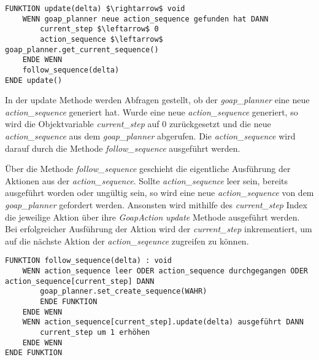 %

\begin{lstlisting}[language=Pseudo, caption={update Methode des \textit{GoapAgent}}, mathescape=true]
FUNKTION update(delta) $\rightarrow$ void
    WENN goap_planner neue action_sequence gefunden hat DANN
        current_step $\leftarrow$ 0
        action_sequence $\leftarrow$ goap_planner.get_current_sequence()
    ENDE WENN
    follow_sequence(delta)
ENDE update()
\end{lstlisting}

In der update Methode werden Abfragen gestellt, ob der \textit{goap\_planner} eine neue \textit{action\_sequence} generiert hat. Wurde eine neue \textit{action\_sequence} generiert, so wird die Objektvariable \textit{current\_step} auf $0$ zurückgesetzt und die neue \textit{action\_sequence} aus dem \textit{goap\_planner} abgerufen. Die \textit{action\_sequence} wird darauf durch die Methode \textit{follow\_sequence} ausgeführt werden.

\"{U}ber die Methode \textit{follow\_sequence} geschieht die eigentliche Ausführung der Aktionen aus der \textit{action\_sequence}. Sollte \textit{action\_sequence} leer sein, bereits ausgeführt worden oder ungültig sein, so wird eine neue \textit{action\_sequence} von dem \textit{goap\_planner} gefordert werden. Ansonsten wird mithilfe des \textit{current\_step} Index die jeweilige Aktion über ihre \textit{GoapAction} \textit{update} Methode ausgeführt werden. Bei erfolgreicher Ausführung der Aktion wird der \textit{current\_step} inkrementiert, um auf die nächste Aktion der \textit{action\_seqeunce} zugreifen zu können.

\begin{lstlisting}[language=Pseudo, caption={\textit{follow\_sequence} Methode des \textit{GoapAgent}}, mathescape=true]
FUNKTION follow_sequence(delta) : void
	WENN action_sequence leer ODER action_sequence durchgegangen ODER action_sequence[current_step] DANN
		goap_planner.set_create_sequence(WAHR)
		ENDE FUNKTION
	ENDE WENN
	WENN action_sequence[current_step].update(delta) ausgeführt DANN
		current_step um 1 erhöhen
	ENDE WENN
ENDE FUNKTION
\end{lstlisting}







